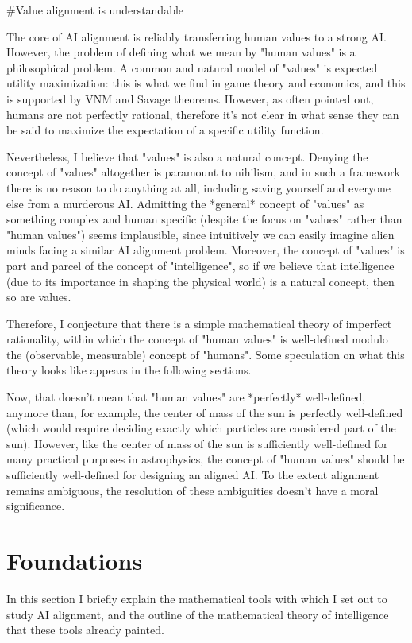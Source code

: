 \documentclass[a4paper]{article}
\begin{document}
\#Value alignment is understandable

The core of AI alignment is reliably transferring human values to a strong AI. However, the problem of defining what we mean by "human values" is a philosophical problem. A common and natural model of "values" is expected utility maximization: this is what we find in game theory and economics, and this is supported by VNM and Savage theorems. However, as often pointed out, humans are not perfectly rational, therefore it's not clear in what sense they can be said to maximize the expectation of a specific utility function.

Nevertheless, I believe that "values" is also a natural concept. Denying the concept of "values" altogether is paramount to nihilism, and in such a framework there is no reason to do anything at all, including saving yourself and everyone else from a murderous AI. Admitting the *general* concept of "values" as something complex and human specific (despite the focus on "values" rather than "human values") seems implausible, since intuitively we can easily imagine alien minds facing a similar AI alignment problem. Moreover, the concept of "values" is part and parcel of the concept of "intelligence", so if we believe that intelligence (due to its importance in shaping the physical world) is a natural concept, then so are values.

Therefore, I conjecture that there is a simple mathematical theory of imperfect rationality, within which the concept of "human values" is well-defined modulo the (observable, measurable) concept of "humans". Some speculation on what this theory looks like appears in the following sections.

Now, that doesn't mean that "human values" are *perfectly* well-defined, anymore than, for example, the center of mass of the sun is perfectly well-defined (which would require deciding exactly which particles are considered part of the sun). However, like the center of mass of the sun is sufficiently well-defined for many practical purposes in astrophysics, the concept of "human values" should be sufficiently well-defined for designing an aligned AI. To the extent alignment remains ambiguous, the resolution of these ambiguities doesn't have a moral significance.

\section{Foundations}

In this section I briefly explain the mathematical tools with which I set out to study AI alignment, and the outline of the mathematical theory of intelligence that these tools already painted.
\end{document}
